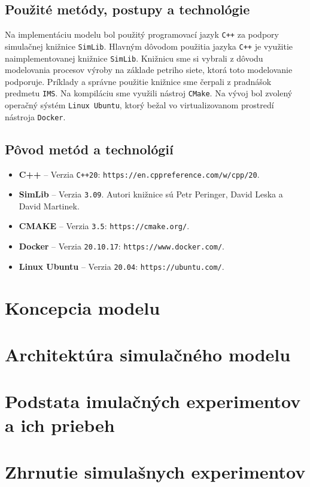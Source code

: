 \documentclass[a4paper, 10pt]{article}
\begin{document}
        \subsection{Použité metódy, postupy a technológie}
        Na implementáciu modelu bol použitý programovací jazyk \texttt{C++} za podpory simulačnej knižnice \texttt{SimLib}.
        Hlavným dôvodom použitia jazyka \texttt{C++} je využitie naimplementovanej
        knižnice \texttt{SimLib}. Knižnicu sme si vybrali z dôvodu modelovania procesov výroby na základe petriho siete, ktorá
        toto modelovanie podporuje. Príklady a správne použitie knižnice sme čerpali z pradnášok predmetu \texttt{IMS}\cite{IMS_slides}.
        Na kompiláciu sme využili nástroj \texttt{CMake}. Na vývoj bol zvolený operačný sýstém
        \texttt{Linux Ubuntu}, ktorý bežal vo virtualizovanom prostredí nástroja \texttt{Docker}.

        \subsection{Pôvod metód a technológií}
    \begin{itemize}
        \item \textbf{C++} -- Verzia \texttt{C++20}: \texttt{https://en.cppreference.com/w/cpp/20}.
        \item \textbf{SimLib} -- Verzia \texttt{3.09}\cite{simblib}. Autori knižnice sú Petr Peringer,
        David Leska a David Martinek.
        \item \textbf{CMAKE} -- Verzia \texttt{3.5}: \texttt{https://cmake.org/}.
        \item \textbf{Docker} -- Verzia \texttt{20.10.17}: \texttt{https://www.docker.com/}.
        \item \textbf{Linux Ubuntu} -- Verzia \texttt{20.04}: \texttt{https://ubuntu.com/}.
    \end{itemize}

    \section {Koncepcia modelu}


    \section{Architektúra simulačného modelu}

    \section{Podstata imulačných experimentov a ich priebeh}

    \section{Zhrnutie simulašnych experimentov}


    \newpage
    
    
\end{document}
